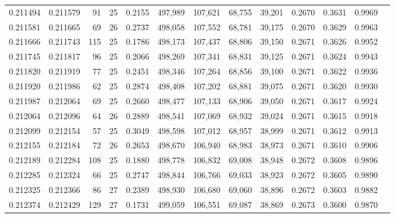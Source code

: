 \begin{tabular}{rrrrrrrrrrrrr}
0.211494 & 0.211579 &  91 &  25 &                                     0.2155 & 497,989 & 107,621 &  68,755 &  39,201 & 0.2670 & 0.3631 & 0.9969 \\
0.211581 & 0.211665 &  69 &  26 &                                     0.2737 & 498,058 & 107,552 &  68,781 &  39,175 & 0.2670 & 0.3629 & 0.9963 \\
0.211666 & 0.211743 & 115 &  25 &                                     0.1786 & 498,173 & 107,437 &  68,806 &  39,150 & 0.2671 & 0.3626 & 0.9952 \\
0.211745 & 0.211817 &  96 &  25 &                                     0.2066 & 498,269 & 107,341 &  68,831 &  39,125 & 0.2671 & 0.3624 & 0.9943 \\
0.211820 & 0.211919 &  77 &  25 &                                     0.2451 & 498,346 & 107,264 &  68,856 &  39,100 & 0.2671 & 0.3622 & 0.9936 \\
0.211920 & 0.211986 &  62 &  25 &                                     0.2874 & 498,408 & 107,202 &  68,881 &  39,075 & 0.2671 & 0.3620 & 0.9930 \\
0.211987 & 0.212064 &  69 &  25 &                                     0.2660 & 498,477 & 107,133 &  68,906 &  39,050 & 0.2671 & 0.3617 & 0.9924 \\
0.212064 & 0.212096 &  64 &  26 &                                     0.2889 & 498,541 & 107,069 &  68,932 &  39,024 & 0.2671 & 0.3615 & 0.9918 \\
0.212099 & 0.212154 &  57 &  25 &                                     0.3049 & 498,598 & 107,012 &  68,957 &  38,999 & 0.2671 & 0.3612 & 0.9913 \\
0.212155 & 0.212184 &  72 &  26 &                                     0.2653 & 498,670 & 106,940 &  68,983 &  38,973 & 0.2671 & 0.3610 & 0.9906 \\
0.212189 & 0.212284 & 108 &  25 &                                     0.1880 & 498,778 & 106,832 &  69,008 &  38,948 & 0.2672 & 0.3608 & 0.9896 \\
0.212285 & 0.212324 &  66 &  25 &                                     0.2747 & 498,844 & 106,766 &  69,033 &  38,923 & 0.2672 & 0.3605 & 0.9890 \\
0.212325 & 0.212366 &  86 &  27 &                                     0.2389 & 498,930 & 106,680 &  69,060 &  38,896 & 0.2672 & 0.3603 & 0.9882 \\
0.212374 & 0.212429 & 129 &  27 &                                     0.1731 & 499,059 & 106,551 &  69,087 &  38,869 & 0.2673 & 0.3600 & 0.9870 \\

\end{tabular}
